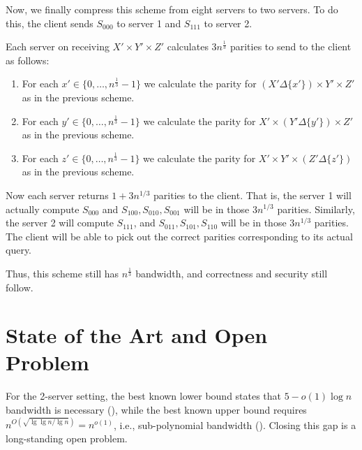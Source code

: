 Now, we finally compress this scheme from eight servers to two servers. To do this, the client sends $S_{000}$ to server 1 and $S_{111}$ to server 2.

Each server on receiving $X' \times Y' \times Z'$ calculates $3 n^{\frac1 3}$ parities to send to the client as follows:
\begin{enumerate}
	\item For each $x' \in \{0,\dots,n^{\frac 1 3} - 1\}$ we calculate the parity for $(X' \Delta \{x'\}) \times Y' \times  Z'$ as in the previous scheme.
	\item For each $y' \in \{0,\dots,n^{\frac 1 3} - 1\}$ we calculate the parity for $X' \times (Y' \Delta \{y'\}) \times  Z'$ as in the previous scheme.
	\item For each $z' \in \{0,\dots,n^{\frac 1 3} - 1\}$ we calculate the parity for $X' \times Y' \times  (Z' \Delta \{z'\})$ as in the previous scheme.
\end{enumerate}

Now each server returns $1+3n^{1/3}$ parities to the client.
That is, the server 1 will actually compute $S_{000}$ and $S_{100}, S_{010}, S_{001}$ will be in those $3n^{1/3}$ parities. 
Similarly, the server 2 will compute $S_{111}$, and $S_{011},S_{101},S_{110}$ will be in those $3n^{1/3}$ parities.
The client will be able to pick out the correct parities corresponding to its actual query.

Thus, this scheme still has $n^{\frac 1 3}$ bandwidth, and correctness and security still follow.

\section{State of the Art and Open Problem}
	For the 2-server setting, the best
known lower bound states that $5 - o(1)\log n$ bandwidth is necessary (\cite{WdW05}),  while the best known upper bound requires 
	$n^{O\left(\sqrt{\lg \lg n / \lg n}\right)} = n^{o(1)}$, i.e., 
sub-polynomial
bandwidth (\cite{dvir20162}). Closing this gap is a long-standing open problem. 


